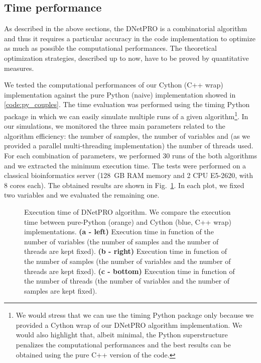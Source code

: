 \documentclass{standalone}
\begin{document}
\subsection[Time performance]{Time performance}\label{implementation:timing}

As described in the above sections, the \textsf{DNetPRO} is a combinatorial algorithm and thus it requires a particular accuracy in the code implementation to optimize as much as possible the computational performances.
The theoretical optimization strategies, described up to now, have to be proved by quantitative measures.

We tested the computational performances of our \textsf{Cython} (\textsf{C++} wrap) implementation against the pure \textsf{Python} (naive) implementation showed in \ref{code:py_couples}.
The time evaluation was performed using the \textsf{timing} \textsf{Python} package in which we can easily simulate multiple runs of a given algorithm\footnote{
  We would stress that we can use the \textsf{timing} \textsf{Python} package only because we provided a \textsf{Cython} wrap of our \textsf{DNetPRO} algorithm implementation.
  We would also highlight that, albeit minimal, the \textsf{Python} superstructure penalizes the computational performances and the best results can be obtained using the pure \textsf{C++} version of the code.
}.
In our simulations, we monitored the three main parameters related to the algorithm efficiency: the number of samples, the number of variables and (as we provided a parallel multi-threading implementation) the number of threads used.
For each combination of parameters, we performed $30$ runs of the both algorithms and we extracted the minimum execution time.
The tests were performed on a classical bioinformatics server (128~GB RAM memory and 2 CPU E5-2620, with 8 cores each).
The obtained results are shown in Fig.~\ref{fig:dnetpro_timing}.
In each plot, we fixed two variables and we evaluated the remaining one.

\begin{figure}[htbp]
\hspace{-1.0cm}
\def\svgwidth{0.45\textwidth}

\qquad
\hspace{1.0cm}
\def\svgwidth{0.45\textwidth}

\qquad\qquad
\centering
\def\svgwidth{0.7\textwidth}

\caption{Execution time of \textsf{DNetPRO} algorithm.
We compare the execution time between pure-\textsf{Python} (orange) and \textsf{Cython} (blue, \textsf{C++} wrap) implementations.
\textbf{(a - left)} Execution time in function of the number of variables (the number of samples and the number of threads are kept fixed).
\textbf{(b - right)} Execution time in function of the number of samples (the number of variables and the number of threads are kept fixed).
\textbf{(c - bottom)} Execution time in function of the number of threads (the number of variables and the number of samples are kept fixed).
}
\label{fig:dnetpro_timing}
\end{figure}
\end{document}
